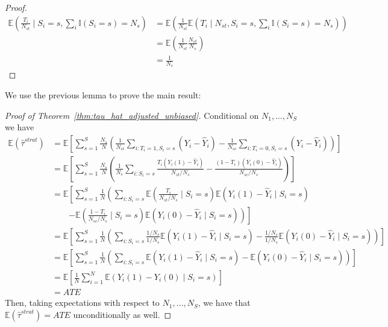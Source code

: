 \documentclass[12pt]{article}
\newcommand{\ind}{\mathbb{I}} %
\newcommand{\ex}{\mathbb{E}} %
\begin{document}
\begin{proof}
\begingroup
\addtolength{\jot}{-0.5em}
\begin{align*}
\ex\left( \frac{T_i}{N_{st}} \mid S_i = s, \sum_{i}\ind{(S_i = s)} = N_s \right) &= \ex\left( \frac{1}{N_{st}} \ex(T_i \mid N_{st}, S_i = s, \sum_{i}\ind{(S_i = s)} = N_s) \right) \\
&= \ex\left( \frac{1}{N_{st}} \frac{N_{st}}{N_s}\right) \\
&= \frac{1}{N_s}
\end{align*}
\endgroup
\end{proof}

\noindent We use the previous lemma to prove the main result:

\begin{proof}[Proof of Theorem~\ref{thm:tau_hat_adjusted_unbiased}]
Conditional on $N_1, \dots, N_S$ we have
\begin{align*}
\ex(\hat{\tau}^{strat}) &= \ex\left[ \sum_{s=1}^{S} \frac{N_s}{N}\left( \frac{1}{N_{st}} \sum_{i: T_i=1, S_i=s} (Y_i - \hat{Y}_i) - \frac{1}{N_{sc}} \sum_{i: T_i=0, S_i=s} (Y_i - \hat{Y}_i)\right) \right] \\
&= \ex\left[ \sum_{s=1}^{S} \frac{N_s}{N}\left( \frac{1}{N_s} \sum_{i: S_i=s} \frac{T_i(Y_i(1) - \hat{Y}_i)}{N_{st}/N_s} - \frac{(1-T_i)(Y_i(0) - \hat{Y}_i)}{N_{sc}/N_s}\right) \right] \\
&=\ex\left[  \sum_{s=1}^{S} \frac{1}{N}\left( \sum_{i: S_i=s} \ex\left(\frac{T_i}{N_{st}/N_s} \mid S_i = s\right)\ex(Y_i(1) - \hat{Y}_i \mid S_i=s) \right.\right. \\
& \qquad\left.\left. - \ex\left(\frac{1-T_i}{N_{sc}/N_s} \mid S_i=s\right)\ex(Y_i(0) - \hat{Y}_i \mid S_i=s) \right) \right] \\
&= \ex\left[ \sum_{s=1}^{S} \frac{1}{N}\left( \sum_{i: S_i=s} \frac{1/N_s}{1/N_s}\ex(Y_i(1) - \hat{Y}_i \mid S_i=s) - \frac{1/N_s}{1/N_s}\ex(Y_i(0) - \hat{Y}_i \mid S_i=s)\right)\right] \\
&= \ex\left[ \sum_{s=1}^{S} \frac{1}{N}\left( \sum_{i: S_i=s} \ex(Y_i(1) - \hat{Y}_i \mid S_i=s) - \ex(Y_i(0) - \hat{Y}_i \mid S_i=s)\right)\right] \\
&= \ex\left[ \frac{1}{N}\sum_{i=1}^N \ex\left(Y_i(1)- Y_i(0) \mid S_i =s \right)\right] \\
&= ATE
\end{align*}
Then, taking expectations with respect to $N_1, \dots, N_S$, we have that $\ex(\hat{\tau}^{strat}) = ATE$ unconditionally as well.
\end{proof}
\end{document}

